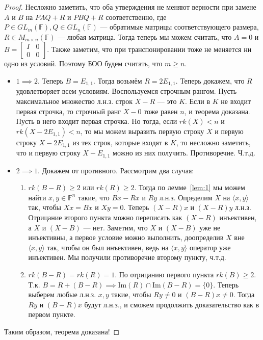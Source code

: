 \documentclass{article}
\begin{document}
\begin{proof}
Несложно заметить, что оба утверждения не меняют верности при замене $A$ и $B$ на $PAQ + R$ и $PBQ + R$ соответственно, где $P \in GL_m(\mathbb{F}), Q \in GL_n(\mathbb{F})$ — обратимые матрицы соответствующего размера, $R \in M_{m \times n}(\mathbb{F})$ — любая матрица. 
Тогда теперь мы можем считать, что $A = 0$ и $B = \begin{bmatrix}
I & 0\\
0 & 0
\end{bmatrix}$. Также заметим, что при транспонировании тоже не меняется ни одно из условий. Поэтому БОО будем считать, что $m \ge n$.
\begin{itemize}
    \item $1 \implies 2$. 
    Теперь $B = E_{1, 1}$. Тогда возьмём $R = 2E_{1, 1}$. Теперь докажем, что $R$ удовлетворяет всем условиям. Воспользуемся строчным рангом. Пусть максимальное множество л.н.з. строк $X - R$ — это $K$. Если в $K$ не входит первая строчка, то строчный ранг $X - 0$ тоже равен $n$, и теорема доказана. Пусть в него входит первая строчка. Но тогда, если $rk(X) < n$ и $rk(X - 2E_{1, 1}) < n$, то мы можем выразить первую строку $X$ и первую строку $X - 2E_{1,1}$ из тех строк, которые входят в $K$, то несложно заметить, что и первую строку $X - E_{1,1}$ можно из них получить. Противоречие.
    Ч.т.д.
    
    \item $2 \implies 1$.
    Докажем от противного. Рассмотрим два случая:
    \begin{enumerate}
        \item $rk(B - R) \ge 2$ или $rk(R) \ge 2$.
        Тогда по лемме~\ref{lem:1} мы можем найти $x, y \in \mathbb{F}^n$ такие, что $Bx - Rx$ и $Ry$ л.н.з. Определим $X$ на $\langle x, y \rangle$ так, чтобы $Xx = Bx$ и $Xy = 0$. Теперь $(X - R)x$ и $(X-R)y$ л.н.з. Отрицание второго пункта можно переписать как $(X - R)$ инъективен, а $X$ и $(X - B)$ — нет. Заметим, что $X$ и $(X - B)$ уже не инъективны, а первое условие можно выполнить, доопределив $X$ вне $\langle x, y \rangle$ так, чтобы он был инъективен, ведь на $\langle x, y \rangle$ оператор уже инъективен. Мы получили противоречие второму пункту, ч.т.д.
        
        \item $rk(B - R) = rk(R) = 1$. По отрицанию первого пункта $rk(B) \ge 2$. Т.к. $B = R + (B-R) \implies \mathrm{Im}(R) \cap \mathrm{Im}(B - R) = \{0\}$. Теперь выберем любые л.н.з. $x, y$ такие, чтобы $Ry \ne 0$ и $(B - R)x \ne 0$. Тогда $Ry$ и $(B - R)x$ будут л.н.з., и сможем продолжить доказательство как в первом пункте.
    \end{enumerate}
\end{itemize}
Таким образом, теорема доказана!
\end{proof}
\end{document}
